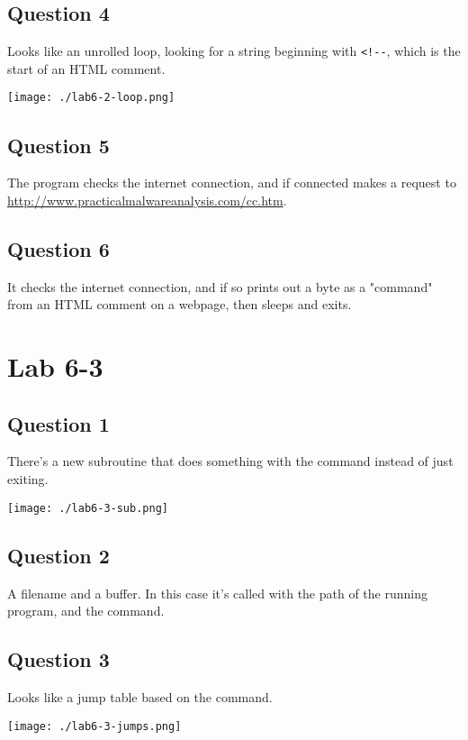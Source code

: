 \documentclass[11pt]{article}
\begin{document}
\subsection{Question 4}
\label{sec:org484141d}
Looks like an unrolled loop, looking for a string beginning with \texttt{<!-{}-},
which is the start of an HTML comment.

\begin{center}
\texttt{[image: ./lab6-2-loop.png]}
\end{center}
\subsection{Question 5}
\label{sec:org482faa5}
The program checks the internet connection, and if connected makes a
request to \url{http://www.practicalmalwareanalysis.com/cc.htm}.
\subsection{Question 6}
\label{sec:orga605e83}
It checks the internet connection, and if so prints out a byte as a
"command" from an HTML comment on a webpage, then sleeps and exits.
\section{Lab 6-3}
\label{sec:orgcb6b7dc}
\subsection{Question 1}
\label{sec:org2d717ac}
There's a new subroutine that does something with the command instead
of just exiting.

\begin{center}
\texttt{[image: ./lab6-3-sub.png]}
\end{center}
\subsection{Question 2}
\label{sec:org19abf77}
A filename and a buffer. In this case it's called with the path of the
running program, and the command.
\subsection{Question 3}
\label{sec:org57ed1a2}
Looks like a jump table based on the command.

\begin{center}
\texttt{[image: ./lab6-3-jumps.png]}
\end{center}
\end{document}
